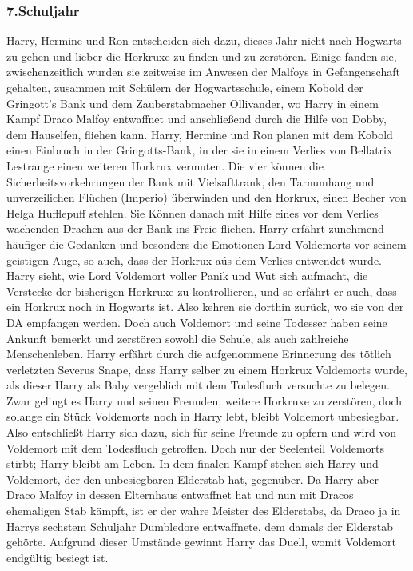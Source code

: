 \documentclass[a4paper, 10pt]{article}
\begin{document}
\subsubsection*{\large 7.Schuljahr}
Harry, Hermine und Ron entscheiden sich dazu, dieses Jahr nicht nach Hogwarts zu gehen und lieber die Horkruxe zu finden und zu zerstören. Einige fanden sie, zwischenzeitlich wurden sie zeitweise im Anwesen der Malfoys in Gefangenschaft gehalten, zusammen mit Schülern der Hogwartsschule, einem Kobold der Gringott's Bank und dem Zauberstabmacher Ollivander, wo Harry in einem Kampf Draco Malfoy entwaffnet und anschließend durch die Hilfe von Dobby, dem Hauselfen, fliehen kann.
\vspace{10pt}
\newline
Harry, Hermine und Ron planen mit dem Kobold einen Einbruch in der Gringotts-Bank, in der sie in einem Verlies von Bellatrix Lestrange einen weiteren Horkrux vermuten. Die vier können die Sicherheitsvorkehrungen der Bank mit Vielsafttrank, den Tarnumhang und unverzeilichen Flüchen (Imperio) überwinden und den Horkrux, einen Becher von Helga Hufflepuff stehlen. Sie Können danach mit Hilfe eines vor dem Verlies wachenden Drachen aus der Bank ins Freie fliehen.
\vspace{10pt}
\newline
Harry erfährt zunehmend häufiger die Gedanken und besonders die Emotionen Lord Voldemorts vor seinem geistigen Auge, so auch, dass der Horkrux aús dem Verlies entwendet wurde. Harry sieht, wie Lord Voldemort voller Panik und Wut sich aufmacht, die Verstecke der bisherigen Horkruxe zu kontrollieren, und so erfährt er auch, dass ein Horkrux noch in Hogwarts ist. Also kehren sie dorthin zurück, wo sie von der DA empfangen werden. Doch auch Voldemort und seine Todesser haben seine Ankunft bemerkt und zerstören sowohl die Schule, als auch zahlreiche Menschenleben.
\vspace{10pt}
\newline
Harry erfährt durch die aufgenommene Erinnerung des tötlich verletzten Severus Snape, dass Harry selber zu einem Horkrux Voldemorts wurde, als dieser Harry als Baby vergeblich mit dem Todesfluch versuchte zu belegen. Zwar gelingt es Harry und seinen Freunden, weitere Horkruxe zu zerstören, doch solange ein Stück Voldemorts noch in Harry lebt, bleibt Voldemort unbesiegbar. Also entschließt Harry sich dazu, sich für seine Freunde zu opfern und wird von Voldemort mit dem Todesfluch getroffen. Doch nur der Seelenteil Voldemorts stirbt; Harry bleibt am Leben.
\vspace{10pt}
\newline
In dem finalen Kampf stehen sich Harry und Voldemort, der den unbesiegbaren Elderstab hat, gegenüber. Da Harry aber Draco Malfoy in dessen Elternhaus entwaffnet hat und nun mit Dracos ehemaligen Stab kämpft, ist er der wahre Meister des Elderstabs, da Draco ja in Harrys sechstem Schuljahr Dumbledore entwaffnete, dem damals der Elderstab gehörte. Aufgrund dieser Umstände gewinnt Harry das Duell, womit Voldemort endgültig besiegt ist.
\end{document}
